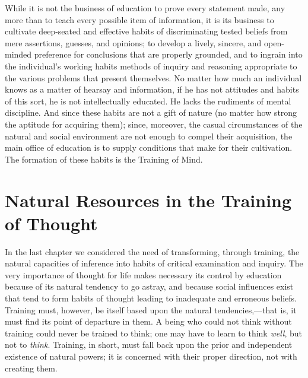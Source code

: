 \documentclass[showtrims,ustradepaper]{memoir}
\begin{document}


While it is not the business of education to prove every statement made,
any more than to teach every possible item of information, it is its
business to
cultivate
deep-seated and effective habits of discriminating tested beliefs from
mere assertions, guesses, and opinions; to develop a lively, sincere,
and open-minded preference for conclusions that are properly grounded,
and to ingrain into the individual's working habits methods of inquiry
and reasoning appropriate to the various problems that present
themselves. No matter how much an individual knows as a matter of
hearsay and information, if he has not attitudes and habits of this
sort, he is not intellectually educated. He lacks the rudiments of
mental discipline. And since these habits are not a gift of nature (no
matter how strong the aptitude for acquiring them); since, moreover, the
casual circumstances of the natural and social environment are not
enough to compel their acquisition, the main office of education is to
supply conditions that make for their cultivation. The formation of
these habits is the Training of
Mind.

\chapter{Natural Resources in the Training of Thought}


In the last chapter we considered the need of transforming, through
training, the natural capacities of inference into habits of critical
examination and inquiry. The very importance of thought for life makes
necessary its control by education because of its natural tendency to go
astray, and because social influences exist that tend to form habits of
thought leading to inadequate and erroneous beliefs. Training must,
however, be itself based upon the natural tendencies,---that is, it must
find its point of departure in them. A being who could not think without
training could never be trained to think; one may have to learn to think
\emph{well}, but not to \emph{think}. Training, in short, must fall back
upon the prior and independent existence of natural powers; it is
concerned with their proper direction, not with creating them.

\end{document}
